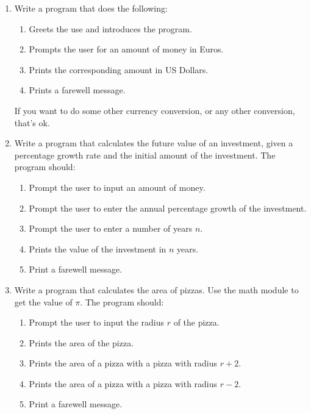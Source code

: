 \documentclass[12pt]{article}
\begin{document}
\begin{enumerate}

\item Write a program that does the following:
\begin{enumerate}
\setlength{\itemsep}{-1mm}
  \item Greets the use and introduces the program.
  \item Prompts the user for an amount of money in Euros.
  \item Prints the corresponding amount in US Dollars.
  \item Prints a farewell message.

\end{enumerate}

If you want to do some other currency conversion, or any other
conversion, that's ok.\\

\item Write a program that calculates the future value of an
  investment, given a percentage growth rate and the initial amount of
  the investment.  The program should:
\begin{enumerate}
\setlength{\itemsep}{-1mm}
  \item Prompt the user to input an amount of money.
  \item Prompt the user to enter the annual percentage growth of the
    investment. 
  \item Prompt the user to enter a number of years $n$.
  \item Prints the value of the investment in $n$ years.
  \item Print a farewell message.\\

\end{enumerate}


\item Write a program that calculates the area of pizzas.  Use the 
  math module to get the value of $\pi$.  The program should:
\begin{enumerate}
\setlength{\itemsep}{-1mm}
  \item Prompt the user to input the radius $r$ of the pizza.
  \item Prints the area of the pizza.
  \item Prints the area of a pizza with a pizza with radius $r+2$.  
  \item Prints the area of a pizza with a pizza with radius $r-2$.  
  \item Print a farewell message. \\
\end{enumerate}



\end{enumerate}
\end{document}

